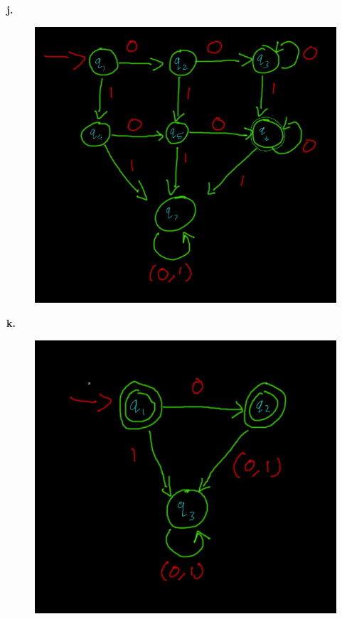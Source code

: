 \documentclass[letter]{article}
\theoremstyle{case}
\begin{document}
\textbf{j.}
\begin{figure}[h!]
	\includegraphics[scale=0.4]{6j.png}
\end{figure}
\newpage
\textbf{k.}
\begin{figure}[h!]
	\includegraphics[scale=0.4]{6k.png}
\end{figure}
\end{document}
